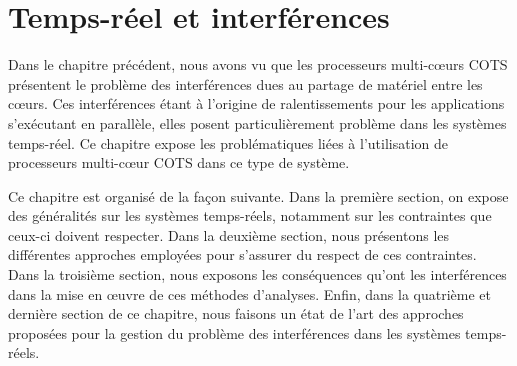 
\chapter{Temps-réel et interférences}

Dans le chapitre précédent, nous avons vu que les processeurs multi-cœurs COTS présentent le problème des interférences dues au partage de matériel entre les cœurs.
Ces interférences étant à l'origine de ralentissements pour les applications s'exécutant en parallèle, elles posent particulièrement problème dans les systèmes temps-réel.
Ce chapitre expose les problématiques liées à l'utilisation de processeurs multi-cœur COTS dans ce type de système.

Ce chapitre est organisé de la façon suivante. 
Dans la première section, on expose des généralités sur les systèmes temps-réels, notamment sur les contraintes que ceux-ci doivent respecter.
Dans la deuxième section, nous présentons les différentes approches employées pour s'assurer du respect de ces contraintes.
Dans la troisième section, nous exposons les conséquences qu'ont les interférences dans la mise en œuvre de ces méthodes d'analyses.
Enfin, dans la quatrième et dernière section de ce chapitre, nous faisons un état de l'art des approches proposées pour la gestion du problème des interférences dans les systèmes temps-réels.





